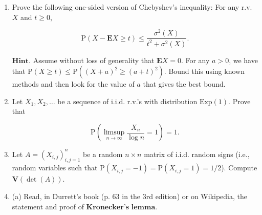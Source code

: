 \documentclass[11pt]{report}
\theoremstyle{plain}
\theoremstyle{definition}
\begin{document}
\begin{enumerate}[label=\arabic*.]
\begin{enumerate}[label=\arabic*.]
\item $\mathrm{P}(\mathbf{T}_n \in B_n) < \epsilon$
\item $2^{n(H(p)-\epsilon)} \le |A_n| \le 2^{n(H(p)+\epsilon)}$.
\end{enumerate}

$\textbf{Notes:}$ The texts in $B_n$ can be thought of as the ``exceptional sequences'' -- they are the Martian texts of length $n$ that are rarely observed. The texts in $A_n$ are called ``typical sequences''. Because of the two-sided bounds the theorem gives on the number of typical sequences, it follows that we can encode them in a computer file of size approximately $n H(p)$ bits, provided we prepare in advance a ``code'' that translates the typical sequences to computer files of the appropriate size (this can be done algorithmically, for example by making a list of all the typical sequences sorted in lexicographic order, and matching them to successive binary strings of length $(H(p)+\epsilon)n$).

$\textbf{Hint.}$ To prove the theorem, let $P_n$ be the random variable given by

\[
P_n = \prod_{k=1}^n \left( p^{X_k} (1-p)^{1-X_k} \right).
\]

Note that $P_n$ measures the probability of the sequence that was observed up to time $n$. (Somewhat unusually, in this problem the probability itself is thought of as a random variable). Try to represent $P_n$ in terms of cumulative sums of a sequence of i.i.d. random variables. Apply the Weak Law of Large Numbers to that sequence, and see where that gets you.
\item Prove the following one-sided version of Chebyshev's inequality: For any r.v. $X$ and $t\ge0$,

\[
\mathrm{P}(X - \mathbf{E} X \ge t) \le \frac{\sigma^2(X)}{t^2 + \sigma^2(X)}.
\]

$\textbf{Hint.}$ Assume without loss of generality that $\mathbf{E} X=0$. For any $a>0$, we have that $\mathrm{P}(X\ge t) \le \mathrm{P}((X+a)^2\ge (a+t)^2)$. Bound this using known methods and then look for the value of $a$ that gives the best bound.
\item Let $X_1,X_2,\ldots$ be a sequence of i.i.d. r.v.'s with distribution $\textrm{Exp}(1)$. Prove that

\[
\mathrm{P}\left( \limsup_{n\to\infty} \frac{X_n}{\log n} = 1\right) = 1.
\]
\item Let $A=(X_{i,j})_{i,j=1}^n$ be a random $n\times n$ matrix of i.i.d. random signs (i.e., random variables such that $\mathrm{P}(X_{i,j}=-1) = \mathrm{P}(X_{i,j}=1)=1/2$). Compute $\mathbf{V}(\det(A))$.
\item (a) Read, in Durrett's book (p. 63 in the 3rd edition) or on Wikipedia, the statement and proof of $\textbf{Kronecker's lemma}$.


\end{enumerate}
\end{document}
